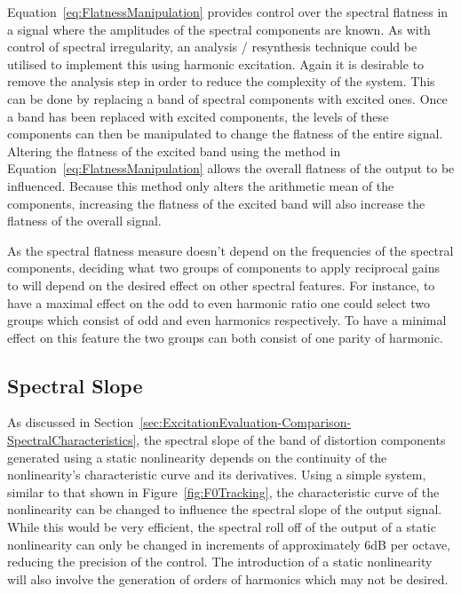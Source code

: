 		Equation~\ref{eq:FlatnessManipulation} provides control over the spectral flatness in a signal where the
		amplitudes of the spectral components are known. As with control of spectral irregularity, an analysis /
		resynthesis technique could be utilised to implement this using harmonic excitation.  Again it is desirable
		to remove the analysis step in order to reduce the complexity of the system.  This can be done by replacing
		a band of spectral components with excited ones. Once a band has been replaced with excited components, the
		levels of these components can then be manipulated to change the flatness of the entire signal. Altering
		the flatness of the excited band using the method in Equation~\ref{eq:FlatnessManipulation} allows the
		overall flatness of the output to be influenced. Because this method only alters the arithmetic mean of the
		components, increasing the flatness of the excited band will also increase the flatness of the overall
		signal.

		As the spectral flatness measure doesn't depend on the frequencies of the spectral components, deciding
		what two groups of components to apply reciprocal gains to will depend on the desired effect on other
		spectral features. For instance, to have a maximal effect on the odd to even harmonic ratio one could
		select two groups which consist of odd and even harmonics respectively. To have a minimal effect on this
		feature the two groups can both consist of one parity of harmonic.

	\subsection{Spectral Slope}
	\label{sec:FeatureControl-Parameterisation-Slope}
		As discussed in Section~\ref{sec:ExcitationEvaluation-Comparison-SpectralCharacteristics}, the spectral
		slope of the band of distortion components generated using a static nonlinearity depends on the continuity
		of the nonlinearity's characteristic curve and its derivatives. Using a simple system, similar to that
		shown in Figure~\ref{fig:F0Tracking}, the characteristic curve of the nonlinearity can be changed to
		influence the spectral slope of the output signal. While this would be very efficient, the spectral roll
		off of the output of a static nonlinearity can only be changed in increments of approximately 6dB per
		octave, reducing the precision of the control. The introduction of a static nonlinearity will also involve
		the generation of orders of harmonics which may not be desired.

